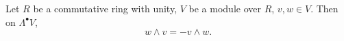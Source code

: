 \begin{proposition}
  Let
    $R$ be a commutative ring with unity,
    $V$ be a module over $R$,
    $v, w \in V$.
  Then on $\Lambda^\bullet V$,
  \begin{equation}
    w \wedge v = - v \wedge w.
  \end{equation}
\end{proposition}
